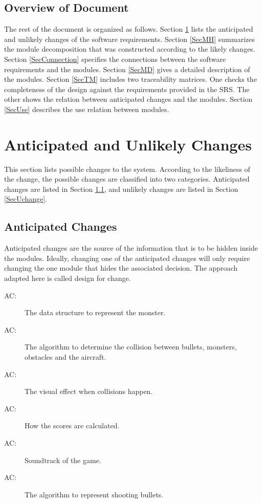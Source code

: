 \documentclass[12pt]{article}
\newcounter{acnum}
\newcommand{\actheacnum}{AC\theacnum}
\begin{document}
\subsection{Overview of Document}
The rest of the document is organized as follows. Section
\ref{SecChange} lists the anticipated and unlikely changes of the software
requirements. Section \ref{SecMH} summarizes the module decomposition that
was constructed according to the likely changes. Section \ref{SecConnection}
specifies the connections between the software requirements and the
modules. Section \ref{SecMD} gives a detailed description of the
modules. Section \ref{SecTM} includes two traceability matrices. One checks
the completeness of the design against the requirements provided in the SRS. The
other shows the relation between anticipated changes and the modules. Section
\ref{SecUse} describes the use relation between modules.

\section{Anticipated and Unlikely Changes} \label{SecChange}

This section lists possible changes to the system. According to the likeliness
of the change, the possible changes are classified into two
categories. Anticipated changes are listed in Section \ref{SecAchange}, and
unlikely changes are listed in Section \ref{SecUchange}.

\subsection{Anticipated Changes} \label{SecAchange}

Anticipated changes are the source of the information that is to be hidden
inside the modules. Ideally, changing one of the anticipated changes will only
require changing the one module that hides the associated decision. The approach
adapted here is called design for
change.

\begin{description}
\item[ \actheacnum :] The data structure to represent the monster.
\item[ \actheacnum :] The algorithm to determine the collision between bullets, monsters, obstacles and the aircraft.
\item [ \actheacnum :]The visual effect when collisions happen.
\item [ \actheacnum :]How the scores are calculated.
\item [ \actheacnum :]Soundtrack of the game.
\item [ \actheacnum :]The algorithm to represent shooting bullets.
\end{description}
\end{document}
